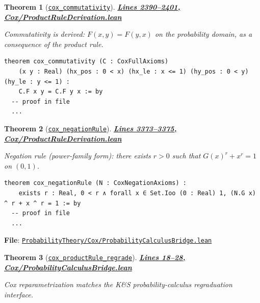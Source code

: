 \documentclass[11pt]{article}
\newtheorem{theorem}{Theorem}[section]
\theoremstyle{definition}
\theoremstyle{remark}
\begin{document}
\begin{theorem}[\href{https://github.com/zariuq/ks-foundations-of-inference/blob/main/ProbabilityTheory/Cox/ProductRuleDerivation.lean\#L2390}{\texttt{cox\_commutativity}}]
\textbf{\href{https://github.com/zariuq/ks-foundations-of-inference/blob/main/ProbabilityTheory/Cox/ProductRuleDerivation.lean\#L2390-L2401}{Lines 2390--2401, Cox/ProductRuleDerivation.lean}}

Commutativity is derived: $F(x,y)=F(y,x)$ on the probability domain, as a consequence of the product rule.
\end{theorem}

\begin{lstlisting}[caption={Cox commutativity derived from multiplicative representation}]
theorem cox_commutativity (C : CoxFullAxioms)
    (x y : Real) (hx_pos : 0 < x) (hx_le : x <= 1) (hy_pos : 0 < y) (hy_le : y <= 1) :
    C.F x y = C.F y x := by
  -- proof in file
  ...
\end{lstlisting}

\begin{theorem}[\href{https://github.com/zariuq/ks-foundations-of-inference/blob/main/ProbabilityTheory/Cox/ProductRuleDerivation.lean\#L3373}{\texttt{cox\_negationRule}}]
\textbf{\href{https://github.com/zariuq/ks-foundations-of-inference/blob/main/ProbabilityTheory/Cox/ProductRuleDerivation.lean\#L3373-L3375}{Lines 3373--3375, Cox/ProductRuleDerivation.lean}}

Negation rule (power-family form): there exists $r>0$ such that $G(x)^r + x^r = 1$ on $(0,1)$.
\end{theorem}

\begin{lstlisting}[caption={Cox negation rule: power-family form}]
theorem cox_negationRule (N : CoxNegationAxioms) :
    exists r : Real, 0 < r ∧ forall x ∈ Set.Ioo (0 : Real) 1, (N.G x) ^ r + x ^ r = 1 := by
  -- proof in file
  ...
\end{lstlisting}

\textbf{File}: \href{https://github.com/zariuq/ks-foundations-of-inference/blob/main/ProbabilityTheory/Cox/ProbabilityCalculusBridge.lean}{\texttt{ProbabilityTheory/Cox/ProbabilityCalculusBridge.lean}}

\begin{theorem}[\href{https://github.com/zariuq/ks-foundations-of-inference/blob/main/ProbabilityTheory/Cox/ProbabilityCalculusBridge.lean\#L28}{\texttt{cox\_productRule\_regrade}}]
\textbf{\href{https://github.com/zariuq/ks-foundations-of-inference/blob/main/ProbabilityTheory/Cox/ProbabilityCalculusBridge.lean\#L18-L28}{Lines 18--28, Cox/ProbabilityCalculusBridge.lean}}

Cox reparametrization matches the K\&S probability-calculus regraduation interface.
\end{theorem}
\end{document}
